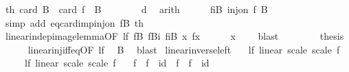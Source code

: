 \begin{isabellebody}
\ th{}{\isacharcolon}{\kern0pt}\ {\isachardoublequoteopen}card\ B\ {\isacharequal}{\kern0pt}\ card\ {\isacharparenleft}{\kern0pt}f\ {\isacharbackquote}{\kern0pt}\ B{\isacharparenright}{\kern0pt}{\isachardoublequoteclose}\isanewline
\ \ \ \ \ \ \isamarkupfalse%
\ d\ \isamarkupfalse%
\ arith\isanewline
\ \ \ \ \isamarkupfalse%
\ fiB{\isacharcolon}{\kern0pt}\ {\isachardoublequoteopen}inj{\isacharunderscore}{\kern0pt}on\ f\ B{\isachardoublequoteclose}\isanewline
\ \ \ \ \ \ \isamarkupfalse%
\ {\isacharparenleft}{\kern0pt}simp\ add{\isacharcolon}{\kern0pt}\ eq{\isacharunderscore}{\kern0pt}card{\isacharunderscore}{\kern0pt}imp{\isacharunderscore}{\kern0pt}inj{\isacharunderscore}{\kern0pt}on\ fB\ th{}{\isacharparenright}{\kern0pt}\isanewline
\ \ \ \ \isamarkupfalse%
\ linear{\isacharunderscore}{\kern0pt}indep{\isacharunderscore}{\kern0pt}image{\isacharunderscore}{\kern0pt}lemma{\isacharbrackleft}{\kern0pt}OF\ lf\ fB\ fBi\ fiB\ x{\isacharbrackright}{\kern0pt}\ fx\isanewline
\ \ \ \ \isamarkupfalse%
\ {\isachardoublequoteopen}x\ {\isacharequal}{\kern0pt}\ {}{\isachardoublequoteclose}\ \isamarkupfalse%
\ blast\isanewline
\ \ \isacommand{{\isacharbraceright}{\kern0pt}}\isamarkupfalse%
\isanewline
\ \ \isamarkupfalse%
\ \isamarkupfalse%
\ {\isacharquery}{\kern0pt}thesis\isanewline
\ \ \ \ \isamarkupfalse%
\ linear{\isacharunderscore}{\kern0pt}inj{\isacharunderscore}{\kern0pt}iff{\isacharunderscore}{\kern0pt}eq{\isacharunderscore}{\kern0pt}{}{\isacharbrackleft}{\kern0pt}OF\ lf{\isacharbrackright}{\kern0pt}\ \isamarkupfalse%
\ B{\isacharparenleft}{\kern0pt}{}{\isacharparenright}{\kern0pt}\ \isamarkupfalse%
\ blast\isanewline
{}\isamarkupfalse%
%
\endisatagproof
{\isafoldproof}%
%
\isadelimproof
\isanewline
%
\endisadelimproof
\isanewline
{}\isamarkupfalse%
\ linear{\isacharunderscore}{\kern0pt}inverse{\isacharunderscore}{\kern0pt}left{\isacharcolon}{\kern0pt}\isanewline
\ \ \ lf{\isacharcolon}{\kern0pt}\ {\isachardoublequoteopen}linear\ scale\ scale\ f{\isachardoublequoteclose}\isanewline
\ \ \ \ \ lf{\isacharprime}{\kern0pt}{\isacharcolon}{\kern0pt}\ {\isachardoublequoteopen}linear\ scale\ scale\ f{\isacharprime}{\kern0pt}{\isachardoublequoteclose}\isanewline
\ \ \ {\isachardoublequoteopen}f\ {\isasymcirc}\ f{\isacharprime}{\kern0pt}\ {\isacharequal}{\kern0pt}\ id\ {\isasymlongleftrightarrow}\ f{\isacharprime}{\kern0pt}\ {\isasymcirc}\ f\ {\isacharequal}{\kern0pt}\ id{\isachardoublequoteclose}\isanewline

\end{isabellebody}
